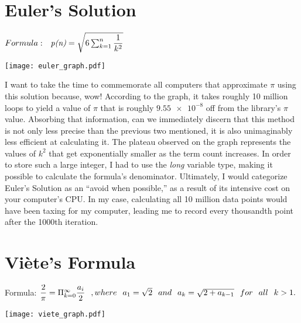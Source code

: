 \documentclass[12pt]{article}
\begin{document}
\vspace{2in}
\section{Euler's Solution}
\normalsize

\centering
$
Formula: \hspace{0.25cm} \textit{p(n)} = \sqrt{6\sum^{n}_{k=1}\dfrac{1}{k^{2}}}
$
\flushleft

\texttt{[image: euler\_graph.pdf]}

I want to take the time to commemorate all computers that approximate $\pi$ using this solution because, wow! According to the graph, it takes roughly 10 million loops to yield a value of $\pi$ that is roughly $\num{9.55e-8}$ off from the library's $\pi$ value. Absorbing that information, can we immediately discern that this method is not only less precise than the previous two mentioned, it is also unimaginably less efficient at calculating it. The plateau observed on the graph represents the values of $k^{2}$ that get exponentially smaller as the term count increases. In order to store such a large integer, I had to use the \textit{long} variable type, making it possible to calculate the formula's denominator. Ultimately, I would categorize Euler's Solution as an \enquote{avoid when possible,} as a result of its intensive cost on your computer's CPU. In my case, calculating all 10 million data points would have been taxing for my computer, leading me to record every thousandth point after the 1000th iteration. 

\vspace{1in}
\section{Vi{\`e}te's Formula}
\normalsize

Formula:
\centering
$
\dfrac{2}{\pi} = \Pi^{\infty}_{k=0}\dfrac{a_i}{2} \hspace{0.25cm} , where \hspace{0.25cm} a_1 = \sqrt{2} \hspace{0.25cm} and \hspace{0.25cm} a_k = \sqrt{2+{a_{k-1}}} \hspace{0.25cm} for \hspace{0.25cm} all \hspace{0.25cm} k > 1.
$

\texttt{[image: viete\_graph.pdf]}
\flushleft
\end{document}
